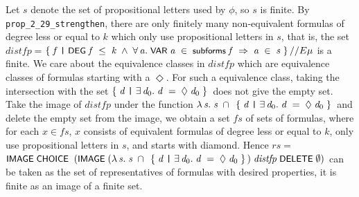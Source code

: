 \documentclass[letterpaper]{article}
\renewcommand{\HOLConst}[1]{{\textsf{\upshape\small #1}}}
\renewcommand{\HOLinline}[1]{\ensuremath{#1}}
\begin{document}
Let $s$ denote the set of propositional letters used by $\phi$, so $s$ is finite. By \texttt{prop_2_29_strengthen}, there are only finitely many non-equivalent formulas of degree less or equal to $k$ which only use propositional letters in $s$, that is, the set $distfp=$\HOLinline{\HOLTokenLeftbrace{}\HOLBoundVar{f}\;\HOLTokenBar{}\;\HOLConst{DEG}\;\HOLBoundVar{f}\;\HOLSymConst{\HOLTokenLeq{}}\;\HOLFreeVar{k}\;\HOLSymConst{\HOLTokenConj{}}\;\HOLSymConst{\HOLTokenForall{}}\HOLBoundVar{a}.\;\HOLConst{VAR}\;\HOLBoundVar{a}\;\HOLSymConst{\HOLTokenIn{}}\;\HOLConst{subforms}\;\HOLBoundVar{f}\;\HOLSymConst{\HOLTokenImp{}}\;\HOLBoundVar{a}\;\HOLSymConst{\HOLTokenIn{}}\;\HOLFreeVar{s}\HOLTokenRightbrace{}\HOLSymConst{//E}\\
\HOLFreeVar{\ensuremath{\mu}}} is a finite. We care about the equivalence classes in $distfp$ which are equivalence classes of formulas starting with a $\Diamond$. For such a equivalence class, taking the intersection with the set \HOLinline{\HOLTokenLeftbrace{}\HOLBoundVar{d}\;\HOLTokenBar{}\;\HOLSymConst{\HOLTokenExists{}}\HOLBoundVar{d\sb{\mathrm{0}}}.\;\HOLBoundVar{d}\;\HOLSymConst{=}\;\HOLSymConst{\ensuremath{\Diamond}}\;\HOLBoundVar{d\sb{\mathrm{0}}}\HOLTokenRightbrace{}} does not give the empty set. Take the image of $distfp$ under the function \HOLinline{\HOLTokenLambda{}\HOLBoundVar{s}.\;\HOLBoundVar{s}\;\HOLSymConst{\HOLTokenInter{}}\;\HOLTokenLeftbrace{}\HOLBoundVar{d}\;\HOLTokenBar{}\;\HOLSymConst{\HOLTokenExists{}}\HOLBoundVar{d\sb{\mathrm{0}}}.\;\HOLBoundVar{d}\;\HOLSymConst{=}\;\HOLSymConst{\ensuremath{\Diamond}}\;\HOLBoundVar{d\sb{\mathrm{0}}}\HOLTokenRightbrace{}} and delete the empty set from the image, we obtain a set $fs$ of sets of formulas, where for each $x\in fs$, $x$ consists of equivalent formulas of degree less or equal to $k$, only use propositional letters in $s$, and starts with diamond. Hence 
$rs=$\HOLinline{\HOLConst{IMAGE}\;\HOLConst{CHOICE}\\
\;\;(\HOLConst{IMAGE}\;(\HOLTokenLambda{}\HOLBoundVar{s}.\;\HOLBoundVar{s}\;\HOLSymConst{\HOLTokenInter{}}\;\HOLTokenLeftbrace{}\HOLBoundVar{d}\;\HOLTokenBar{}\;\HOLSymConst{\HOLTokenExists{}}\HOLBoundVar{d\sb{\mathrm{0}}}.\;\HOLBoundVar{d}\;\HOLSymConst{=}\;\HOLSymConst{\ensuremath{\Diamond}}\;\HOLBoundVar{d\sb{\mathrm{0}}}\HOLTokenRightbrace{})\;\HOLFreeVar{distfp}\;\HOLConst{DELETE}\;\HOLSymConst{\HOLTokenEmpty{}})} can be taken as the set of representatives of formulas with desired properties, it is finite as an image of a finite set. 
\end{document}
